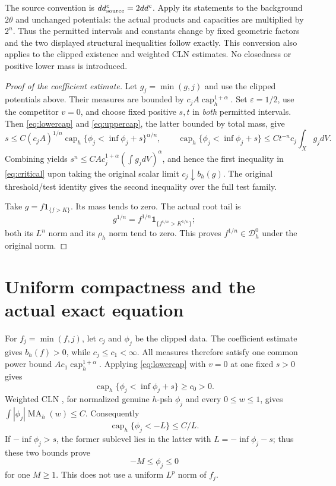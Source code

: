 \documentclass[11pt]{article}
\newcommand{\ddc}{dd^c}
\newcommand{\MA}{\operatorname{MA}}
\newcommand{\capH}{\operatorname{cap}}
\newcommand{\Dzero}{\mathcal D_h^0}
\theoremstyle{remark}\newtheorem{remark}[theorem]{Remark}
\begin{document}
The source convention is $\ddc_{\rm source}=2\ddc$.
Apply its statements to the background $2\theta$ and unchanged
potentials: the actual products and capacities are multiplied by $2^n$.
Thus the permitted intervals and constants change by fixed geometric
factors and the two displayed structural inequalities follow exactly.
This conversion also applies to the clipped existence and weighted
CLN estimates. No closedness or positive lower mass is introduced.

\begin{proof}[Proof of the coefficient estimate]
Let $g_j=\min(g,j)$ and use the clipped potentials above. Their measures
are bounded by $c_jA\capH_h^{1+\alpha}$. Set $\varepsilon=1/2$,
use the competitor $v=0$, and choose fixed positive $s,t$ in \emph{both}
permitted intervals. Then \eqref{eq:lowercap} and
\eqref{eq:uppercap}, the latter bounded by total mass, give
\[
 s\leq C(c_jA)^{1/n}\capH_h\{\phi_j<\inf\phi_j+s\}^{\alpha/n},
 \qquad
 \capH_h\{\phi_j<\inf\phi_j+s\}
    \leq Ct^{-n}c_j\int_Xg_jdV.
\]
Combining yields
$s^n\leq C A c_j^{1+\alpha}(\int g_jdV)^\alpha$, and hence
the first inequality in \eqref{eq:critical} upon taking the original
scalar limit $c_j\downarrow b_h(g)$. The original threshold/test
identity gives the second inequality over the full test family.

Take $g=f\mathbf1_{\{f>K\}}$. Its mass tends to zero. The actual root
tail is
\[
 g^{1/n}=f^{1/n}\mathbf1_{\{f^{1/n}>K^{1/n}\}};
\]
both its $L^n$ norm and its $\rho_h$ norm tend to zero.
This proves $f^{1/n}\in\Dzero$ under the original norm.
\end{proof}

\section{Uniform compactness and the actual exact equation}
For $f_j=\min(f,j)$, let $c_j$ and $\phi_j$ be the clipped data.
The coefficient estimate gives $b_h(f)>0$, while $c_j\leq c_1<\infty$.
All measures therefore satisfy one common power bound
$Ac_1\capH_h^{1+\alpha}$. Applying \eqref{eq:lowercap} with $v=0$
at one fixed $s>0$ gives
\[
 \capH_h\{\phi_j<\inf\phi_j+s\}\geq c_0>0.
\]
Weighted CLN \cite[Proposition 1.1]{Ngu}, for normalized genuine
$h$-psh $\phi_j$ and every $0\leq w\leq1$, gives
$\int|\phi_j|\MA_h(w)\leq C$. Consequently
\[
 \capH_h\{\phi_j<-L\}\leq C/L.
\]
If $-\inf\phi_j>s$, the former sublevel lies in the latter with
$L=-\inf\phi_j-s$; thus these two bounds prove
\begin{equation}\label{eq:bound}
 -M\leq\phi_j\leq0
\end{equation}
for one $M\geq1$. This does not use a uniform $L^p$ norm of $f_j$.
\end{document}
